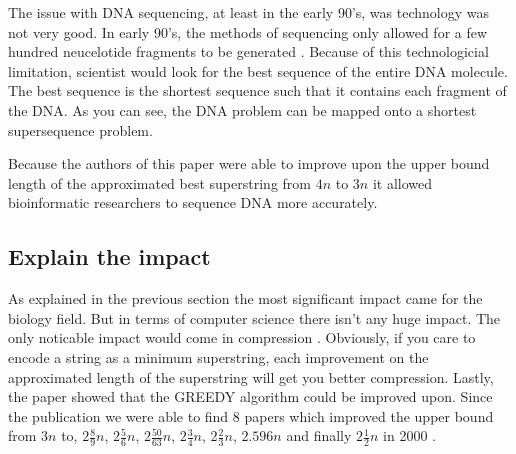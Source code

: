 \documentclass[letterpaper,twocolumn,11pt]{article}
\begin{document}
The issue with DNA sequencing, at least in the early 90's, was technology was not very good. In early 90's, the methods of sequencing only allowed for a few hundred neucelotide fragments to be generated \cite{karp1993mapping}. Because of this technologicial limitation, scientist would look for the best sequence of the entire DNA molecule. The best sequence is the shortest sequence such that it contains each fragment of the DNA. As you can see, the DNA problem can be mapped onto a shortest supersequence problem. 

Because the authors of this paper were able to improve upon the upper bound length of the approximated best superstring from $4n$ to $3n$ it allowed bioinformatic researchers to sequence DNA more accurately. 



\subsection*{Explain the impact}
As explained in the previous section the most significant impact came for the biology field. But in terms of computer science there isn't any huge impact. The only noticable impact would come in compression \cite{storer1988data}. Obviously, if you care to encode a string as a minimum superstring, each improvement on the approximated length of the superstring will get you better compression. Lastly, the paper showed that the GREEDY algorithm could be improved upon. Since the publication we were able to find 8 papers which improved the upper bound from $3n$ to, $2 \frac{8}{9}n$, $2 \frac{5}{6}n$, $2 \frac{50}{63}n$, $2 \frac{3}{4}n$, $2 \frac{2}{3}n$, $2.596n$ and finally $2 \frac{1}{2}n$ in 2000 \cite{sweedyk2000boldmath}.





{
  \small 
  
  
}
\end{document}
